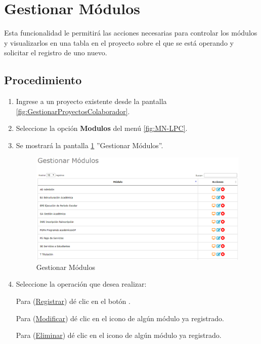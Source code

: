 \hypertarget{cv:GestionarModulos}{\section{Gestionar Módulos}} \label{sec:GestionarModulos}

	Esta funcionalidad le permitirá las acciones necesarias para controlar los módulos y visualizarlos en una tabla en el proyecto sobre el que se está operando y solicitar el registro de uno nuevo.

		\subsection{Procedimiento}

			\begin{enumerate}
				
			\item Ingrese a un proyecto existente desde la pantalla \ref{fig:GestionarProyectosColaborador}.
	
			\item Seleccione la opción \textbf{Modulos} del menú \ref{fig:MN-LPC}.
	
			\item Se mostrará la pantalla \ref{fig:GestionarModulos} ''Gestionar Módulos''.

			\begin{figure}[htbp!]
				\begin{center}
					\includegraphics[scale=0.6]{roles/lider/modulos/pantallas/IU5gestionarModulos}
					\caption{Gestionar Módulos}
					\label{fig:GestionarModulos}
				\end{center}
			\end{figure}
		
				\item Seleccione la operación que desea realizar:
			
			Para (\hyperlink{cv:registrarModulo}{Registrar}) dé clic en el botón \IURegistrar.
			
			Para (\hyperlink{cv:modificarModulo}{Modificar}) dé clic en el icono \IUEditar{} de algún módulo ya registrado.
			
			Para (\hyperlink{cv:eliminarProyecto}{Eliminar}) dé clic en el icono \IUBotonEliminar{} de algún módulo ya registrado.
			
			
			\end{enumerate}